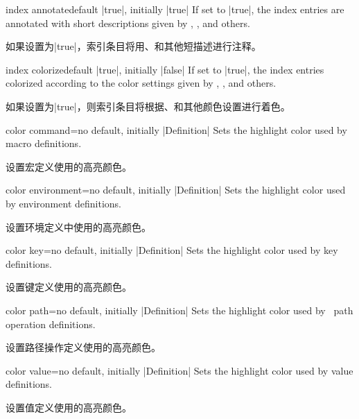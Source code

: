 
\begin{docTcbKey}{index annotate}{}{default |true|, initially |true|}
If set to |true|, the index entries are annotated with short descriptions
given by , ,
and others.

如果设置为|true|，索引条目将用、和其他短描述进行注释。
\end{docTcbKey}

\begin{docTcbKey}{index colorize}{}{default |true|, initially |false|}
If set to |true|, the index entries colorized according to the color
settings given by , ,
and others.

如果设置为|true|，则索引条目将根据、和其他颜色设置进行着色。
\end{docTcbKey}


\begin{docTcbKey}{color command}{=}{no default, initially |Definition|}
Sets the highlight color used by macro definitions.

设置宏定义使用的高亮颜色。
\end{docTcbKey}

\begin{docTcbKey}{color environment}{=}{no default, initially |Definition|}
Sets the highlight color used by environment definitions.

设置环境定义中使用的高亮颜色。
\end{docTcbKey}

\begin{docTcbKey}{color key}{=}{no default, initially |Definition|}
Sets the highlight color used by key definitions.

设置键定义使用的高亮颜色。
\end{docTcbKey}

\begin{docTcbKey}[][doc new={2019-09-18}]{color path}{=}{no default, initially |Definition|}
Sets the highlight color used by \tikzname\ path operation definitions.

设置\tikzname 路径操作定义使用的高亮颜色。
\end{docTcbKey}

\begin{docTcbKey}{color value}{=}{no default, initially |Definition|}
Sets the highlight color used by value definitions.

设置值定义使用的高亮颜色。
\end{docTcbKey}

